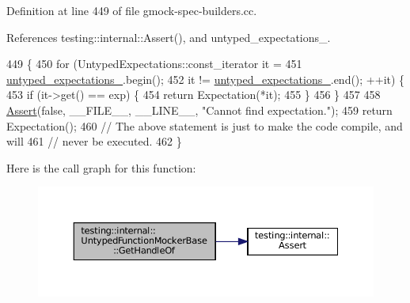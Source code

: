 Definition at line 449 of file gmock-\/spec-\/builders.\+cc.



References testing\+::internal\+::\+Assert(), and untyped\+\_\+expectations\+\_\+.


\begin{DoxyCode}
449                                                                        \{
450   \textcolor{keywordflow}{for} (UntypedExpectations::const\_iterator it =
451            \hyperlink{classtesting_1_1internal_1_1UntypedFunctionMockerBase_aae4a42a4bace1fcb0cd4bdf1ddd40277}{untyped\_expectations\_}.begin();
452        it != \hyperlink{classtesting_1_1internal_1_1UntypedFunctionMockerBase_aae4a42a4bace1fcb0cd4bdf1ddd40277}{untyped\_expectations\_}.end(); ++it) \{
453     \textcolor{keywordflow}{if} (it->get() == exp) \{
454       \textcolor{keywordflow}{return} Expectation(*it);
455     \}
456   \}
457 
458   \hyperlink{namespacetesting_1_1internal_a7a259643b7f2d23ce2b757728df42c99}{Assert}(\textcolor{keyword}{false}, \_\_FILE\_\_, \_\_LINE\_\_, \textcolor{stringliteral}{"Cannot find expectation."});
459   \textcolor{keywordflow}{return} Expectation();
460   \textcolor{comment}{// The above statement is just to make the code compile, and will}
461   \textcolor{comment}{// never be executed.}
462 \}
\end{DoxyCode}
Here is the call graph for this function\+:
\nopagebreak
\begin{figure}[H]
\begin{center}
\leavevmode
\includegraphics[width=350pt]{classtesting_1_1internal_1_1UntypedFunctionMockerBase_a7705611c4a63df16cddb0674878c403a_cgraph}
\end{center}
\end{figure}
\mbox{\label{classtesting_1_1internal_1_1UntypedFunctionMockerBase_a71863dd67193a7082078d5b366d5ce51}} 
